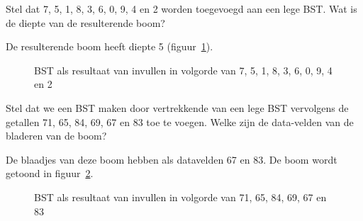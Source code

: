 \begin{oef}
\papier Stel dat 7, 5, 1, 8, 3, 6, 0, 9, 4 en 2 worden toegevoegd aan een lege BST. Wat is de diepte van de resulterende boom?
\begin{opl}
De resulterende boom heeft diepte 5 (figuur~\ref{fig:herhoefBST3}).
\begin{figure}[htbp]
    \centering
{}
\caption{BST als resultaat van invullen in volgorde van 7, 5, 1, 8, 3, 6, 0, 9, 4 en 2}
    \label{fig:herhoefBST3}
\end{figure}
\end{opl}

\end{oef}



\begin{oef}
\papier Stel dat we een BST maken door vertrekkende van een lege BST vervolgens de getallen 71, 65, 84, 69, 67 en 83 toe te voegen. Welke zijn de data-velden van de bladeren van de boom?
\begin{opl}
De blaadjes van deze boom hebben als datavelden 67 en 83. De boom wordt getoond in figuur~\ref{fig:herhoefBST4}.
\begin{figure}[htbp]
    \centering
{}
\caption{BST als resultaat van invullen in volgorde van 71, 65, 84, 69, 67 en 83}
    \label{fig:herhoefBST4}
\end{figure}
\end{opl}

\end{oef}



